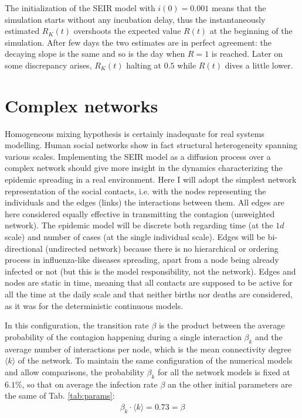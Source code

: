 \documentclass[DIV=12, BCOR=0pt]{scrartcl}  %
\begin{document}
	The initialization of the SEIR model with $i(0) = 0.001$ means that the simulation starts without any incubation delay, thus the instantaneously estimated $R_K(t)$ overshoots the expected value $R(t)$ at the beginning of the simulation. After few days the two estimates are in perfect agreement: the decaying slope is the same and so is the day when $R = 1$ is reached. Later on some discrepancy arises, $R_K(t)$ halting at $0.5$ while $R(t)$ dives a little lower.
 
  

  
  \section{Complex networks}
  \label{sec:network}
  Homogeneous mixing hypothesis is certainly inadequate for real systems modelling. Human social networks show in fact structural heterogeneity spanning various scales. Implementing the SEIR model as a diffusion process over a complex network should give more insight in the dynamics characterizing the epidemic spreading in a real environment. Here I will adopt the simplest network representation of the social contacts, i.e. with the nodes representing the individuals and the edges (links) the interactions between them. All edges are here considered equally effective in transmitting the contagion (unweighted network). The epidemic model will be discrete both regarding time (at the $1 d$ scale) and number of cases (at the single individual scale). Edges will be bi-directional (undirected network) because there is no hierarchical or ordering process in influenza-like diseases spreading, apart from a node being already infected or not (but this is the model responsibility, not the network). Edges and nodes are static in time, meaning that all contacts are supposed to be active for all the time at the daily scale and that neither births nor deaths are considered, as it was for the deterministic continuous models. 
  
  In this configuration, the transition rate $\beta$ is the product between the average probability of the contagion happening during a single interaction $\beta_k$ and the average number of interactions per node, which is the mean connectivity degree $\langle k \rangle$ of the network. 
  To maintain the same configuration of the numerical models and allow comparisons, the probability $\beta_k$ for all the network models is fixed at $6.1 \%$, so that on average the infection rate $\beta$ an the other initial parameters are the same of Tab. \ref{tab:params}:
  \begin{align}
  	\beta_k \cdot \langle k \rangle = 0.73 = \beta
  \end{align}
\end{document}
